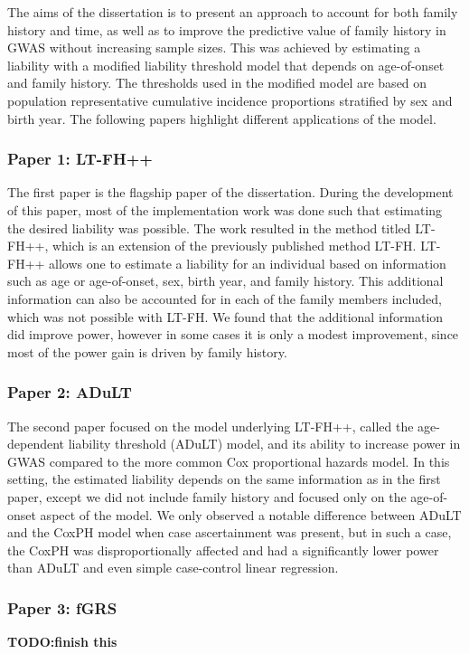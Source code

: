 The aims of the dissertation is to present an approach to account for both family history and time, as well as to improve the predictive value of family history in GWAS without increasing sample sizes. This was achieved by estimating a liability with a modified liability threshold model that depends on age-of-onset and family history. The thresholds used in the modified model are based on population representative cumulative incidence proportions stratified by sex and birth year. The following papers highlight different applications of the model.

\subsubsection{Paper 1: LT-FH++}
The first paper is the flagship paper of the dissertation. During the development of this paper, most of the implementation work was done such that estimating the desired liability was possible. The work resulted in the method titled LT-FH++, which is an extension of the previously published method LT-FH. LT-FH++ allows one to estimate a liability for an individual based on information such as age or age-of-onset, sex, birth year, and family history. This additional information can also be accounted for in each of the family members included, which was not possible with LT-FH. We found that the additional information did improve power, however in some cases it is only a modest improvement, since most of the power gain is driven by family history.

\subsubsection{Paper 2: ADuLT}
The second paper focused on the model underlying LT-FH++, called the age-dependent liability threshold (ADuLT) model, and its ability to increase power in GWAS compared to the more common Cox proportional hazards model. In this setting, the estimated liability depends on the same information as in the first paper, except we did not include family history and focused only on the age-of-onset aspect of the model. We only observed a notable difference between ADuLT and the CoxPH model when case ascertainment was present, but in such a case, the CoxPH was disproportionally affected and had a significantly lower power than ADuLT and even simple case-control linear regression.


\subsubsection{Paper 3: fGRS}
\textbf{TODO:finish this}